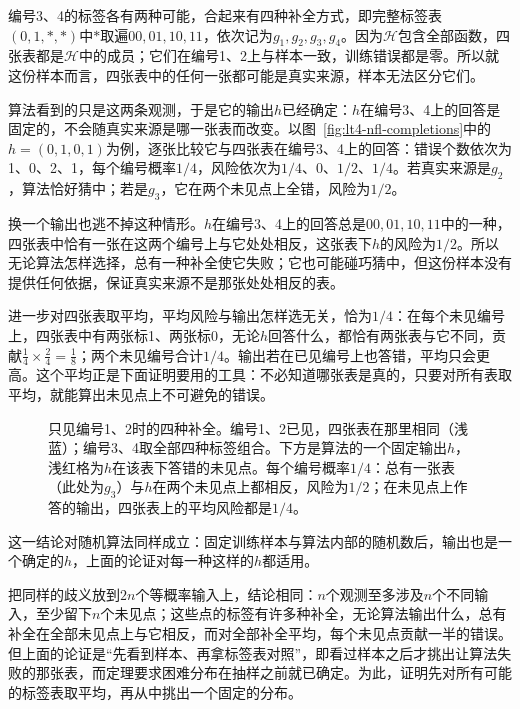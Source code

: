 编号3、4的标签各有两种可能，合起来有四种补全方式，即完整标签表$(0,1,\ast,\ast)$中$\ast$取遍$00,01,10,11$，依次记为$g_1,g_2,g_3,g_4$。因为$\mathcal H$包含全部函数，四张表都是$\mathcal H$中的成员；它们在编号1、2上与样本一致，训练错误都是零。所以就这份样本而言，四张表中的任何一张都可能是真实来源，样本无法区分它们。

算法看到的只是这两条观测，于是它的输出$h$已经确定：$h$在编号3、4上的回答是固定的，不会随真实来源是哪一张表而改变。以图~\ref{fig:lt4-nfl-completions}中的$h=(0,1,0,1)$为例，逐张比较它与四张表在编号3、4上的回答：错误个数依次为1、0、2、1，每个编号概率$1/4$，风险依次为$1/4$、$0$、$1/2$、$1/4$。若真实来源是$g_2$，算法恰好猜中；若是$g_3$，它在两个未见点上全错，风险为$1/2$。

换一个输出也逃不掉这种情形。$h$在编号3、4上的回答总是$00,01,10,11$中的一种，四张表中恰有一张在这两个编号上与它处处相反，这张表下$h$的风险为$1/2$。所以无论算法怎样选择，总有一种补全使它失败；它也可能碰巧猜中，但这份样本没有提供任何依据，保证真实来源不是那张处处相反的表。

进一步对四张表取平均，平均风险与输出怎样选无关，恰为$1/4$：在每个未见编号上，四张表中有两张标1、两张标0，无论$h$回答什么，都恰有两张表与它不同，贡献$\frac14\times\frac24=\frac18$；两个未见编号合计$1/4$。输出若在已见编号上也答错，平均只会更高。这个平均正是下面证明要用的工具：不必知道哪张表是真的，只要对所有表取平均，就能算出未见点上不可避免的错误。

\begin{figure}[htbp]
 \centering
 
 \caption{只见编号1、2时的四种补全。编号1、2已见，四张表在那里相同（浅蓝）；编号3、4取全部四种标签组合。下方是算法的一个固定输出$h$，浅红格为$h$在该表下答错的未见点。每个编号概率$1/4$：总有一张表（此处为$g_3$）与$h$在两个未见点上都相反，风险为$1/2$；在未见点上作答的输出，四张表上的平均风险都是$1/4$。}
 \label{fig:lt4-nfl-completions}
 \label{fig:learning-no-free-lunch}
\end{figure}

这一结论对随机算法同样成立：固定训练样本与算法内部的随机数后，输出也是一个确定的$h$，上面的论证对每一种这样的$h$都适用。

把同样的歧义放到$2n$个等概率输入上，结论相同：$n$个观测至多涉及$n$个不同输入，至少留下$n$个未见点；这些点的标签有许多种补全，无论算法输出什么，总有补全在全部未见点上与它相反，而对全部补全平均，每个未见点贡献一半的错误。但上面的论证是“先看到样本、再拿标签表对照”，即看过样本之后才挑出让算法失败的那张表，而定理要求困难分布在抽样之前就已确定。为此，证明先对所有可能的标签表取平均，再从中挑出一个固定的分布。

